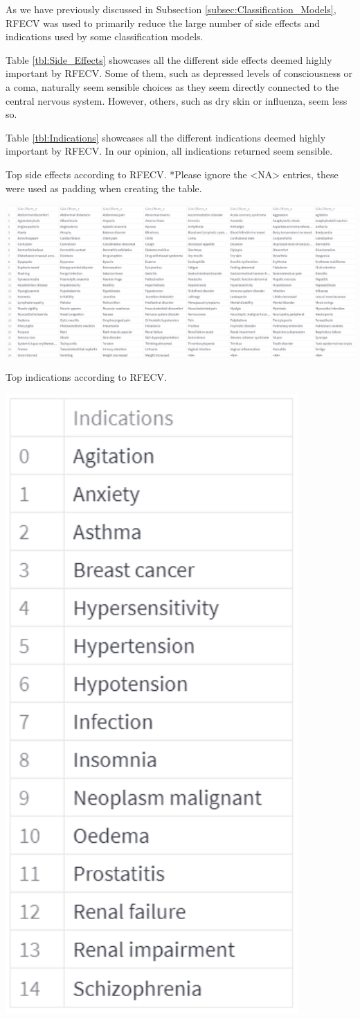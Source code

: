 As we have previously discussed in Subsection \ref{subsec:Classification_Models}, RFECV was used to primarily reduce the large number of side effects and indications used by some classification models. 

Table \ref{tbl:Side_Effects} showcases all the different side effects deemed highly important by RFECV. Some of them, such as depressed levels of consciousness or a coma, naturally seem sensible choices as they seem directly connected to the central nervous system. However, others, such as dry skin or influenza, seem less so.

Table \ref{tbl:Indications} showcases all the different indications deemed highly important by RFECV. In our opinion, all indications returned seem sensible.

\begin{table}[!ht]
  \caption{Top side effects according to RFECV. *Please ignore the <NA> entries, these were used as padding when creating the table.}
  \label{tbl:Side_Effects}
  \includegraphics[width=1.0\linewidth]{images/Side Effects.pdf}
\end{table}

\begin{table}[!ht]
  \caption{Top indications according to RFECV.}
  \label{tbl:Indications}
  \includegraphics[width=0.2\linewidth]{images/Indications.pdf}
\end{table}


